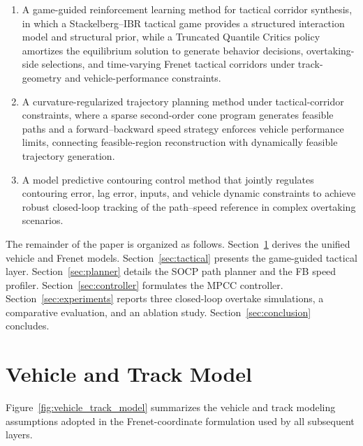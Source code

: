 \documentclass{iopjournal}
\begin{document}
\begin{enumerate}
    \item A game-guided reinforcement learning method for tactical corridor
    synthesis, in which a Stackelberg--IBR tactical game provides a structured
    interaction model and structural prior, while a Truncated Quantile Critics
    policy amortizes the equilibrium solution to generate behavior decisions,
    overtaking-side selections, and time-varying Frenet tactical corridors
    under track-geometry and vehicle-performance constraints.

    \item A curvature-regularized trajectory planning method under
    tactical-corridor constraints, where a sparse second-order cone program
    generates feasible paths and a forward--backward speed strategy enforces
    vehicle performance limits, connecting feasible-region reconstruction with
    dynamically feasible trajectory generation.

    \item A model predictive contouring control method that jointly regulates
    contouring error, lag error, inputs, and vehicle dynamic constraints to
    achieve robust closed-loop tracking of the path--speed reference in complex
    overtaking scenarios.
\end{enumerate}



The remainder of the paper is organized as follows.
Section~\ref{sec:model} derives the unified vehicle and Frenet models.
Section~\ref{sec:tactical} presents the game-guided tactical layer.
Section~\ref{sec:planner} details the SOCP path planner and the FB speed
profiler.
Section~\ref{sec:controller} formulates the MPCC controller.
Section~\ref{sec:experiments} reports three closed-loop overtake simulations,
a comparative evaluation, and an ablation study.
Section~\ref{sec:conclusion} concludes.

\section{Vehicle and Track Model}\label{sec:model}
Figure~\ref{fig:vehicle_track_model} summarizes the vehicle and track modeling
assumptions adopted in the Frenet-coordinate formulation used by all subsequent
layers.

\end{document}

